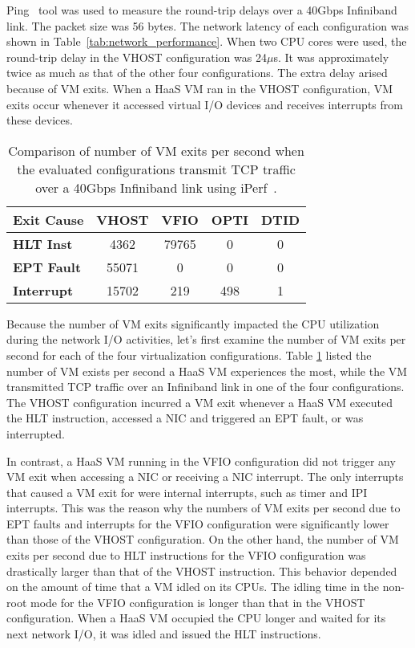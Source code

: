 Ping~\cite{ping} tool was used to measure the round-trip
delays over a 40Gbps Infiniband link. The packet size was 56
bytes. The network latency of each configuration was shown in
Table~\ref{tab:network_performance}. When two CPU cores were
used, the round-trip delay in the VHOST configuration was
24$\mu$s. It was approximately twice as much as that of the
other four configurations. The extra delay arised because of
VM exits. When a HaaS VM ran in the VHOST configuration, VM
exits occur whenever it accessed virtual I/O devices and
receives interrupts from these devices.

\begin{table}
\renewcommand{\arraystretch}{1.2}
\small
\begin{center}
\begin{tabular}{|l|c|c|c|c|} \hline
{\bf Exit Cause} & {\bf VHOST } & {\bf VFIO} & {\bf OPTI} & {\bf DTID} \\ \hline
{\bf HLT Inst}   & 4362  & 79765 & 0    & 0    \\ \hline
{\bf EPT Fault}  & 55071 & 0     & 0    & 0    \\ \hline
{\bf Interrupt}  & 15702 & 219   & 498  & 1    \\ \hline
\end{tabular}
\end{center}
\vspace{-0.1in}
\caption{Comparison of number of VM exits per second when the
evaluated configurations transmit TCP traffic over a 40Gbps
Infiniband link using iPerf~\cite{iperf}.}
\label{tab:vm_exit}
\vspace{-0.1in}
\end{table}

Because the number of VM exits significantly impacted the CPU
utilization during the network I/O activities, let's first
examine the number of VM exits per second for each of the four
virtualization configurations. Table \ref{tab:vm_exit} listed
the number of VM exists per second a HaaS VM experiences the
most, while the VM transmitted TCP traffic over an Infiniband
link in one of the four configurations. The VHOST
configuration incurred a VM exit whenever a HaaS VM executed
the HLT instruction, accessed a NIC and triggered an EPT
fault, or was interrupted.

In contrast, a HaaS VM running in the VFIO configuration did
not trigger any VM exit when accessing a NIC or receiving a
NIC interrupt. The only interrupts that caused a VM exit for
were internal interrupts, such as timer and IPI interrupts.
This was the reason why the numbers of VM exits per second due
to EPT faults and interrupts for the VFIO configuration were
significantly lower than those of the VHOST configuration. On
the other hand, the number of VM exits per second due to HLT
instructions for the VFIO configuration was drastically larger
than that of the VHOST instruction. This behavior depended on
the amount of time that a VM idled on its CPUs. The idling
time in the non-root mode for the VFIO configuration is longer
than that in the VHOST configuration. When a HaaS VM occupied
the CPU longer and waited for its next network I/O, it was
idled and issued the HLT instructions.

